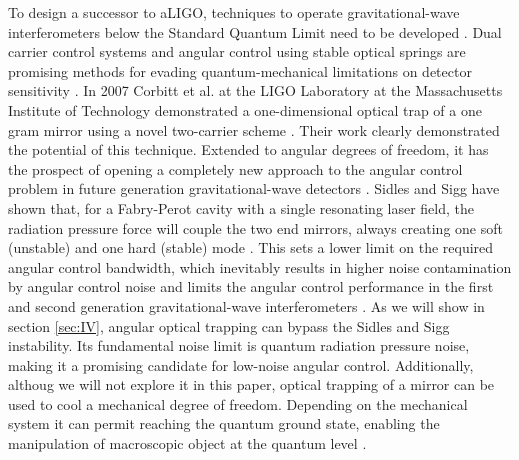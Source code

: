 \documentclass[%
 reprint,
 amsmath,amssymb,
 aps,
]{revtex4-1}
\begin{document}
To design a successor to aLIGO, techniques to operate gravitational-wave interferometers below 
the Standard Quantum Limit need to be developed \cite{Dan12, Chen13}. Dual carrier control systems and angular control 
using stable optical springs are promising methods for evading quantum-mechanical limitations on 
detector sensitivity \cite{LIGO10, Braginsky02b, Arcizet06b, Corbitt06b, Kippenberg05, Sheard04}. 
In 2007 Corbitt et al. at the LIGO Laboratory at the Massachusetts Institute of Technology 
demonstrated a one-dimensional optical trap of a one gram mirror using a novel two-carrier scheme \cite{Corbitt07}. 
Their work 
clearly demonstrated the potential of this technique. Extended to angular degrees of freedom, it has 
the prospect of opening a completely new approach to the angular control problem in future generation 
gravitational-wave detectors \cite{Punturo10}. 
Sidles and Sigg have shown that, for a Fabry-Perot cavity with a single 
resonating laser field, the radiation pressure force will couple the two end mirrors, always creating one 
soft (unstable) and one hard (stable) mode \cite{Sidles06}. This sets a lower limit on the required angular control 
bandwidth, which inevitably results in higher noise contamination by angular control noise and limits the angular control performance in the first and second generation 
gravitational-wave interferometers \cite{LIGO10, Braginsky01, Dooley13, Hirose10}. 
As we will show in section \ref{sec:IV}, angular optical trapping can bypass the Sidles and Sigg instability. Its fundamental noise limit is quantum radiation pressure noise, making it a promising candidate for low-noise angular control. Additionally, 
althoug we will not explore it in this paper, optical trapping of a mirror can be used to cool a mechanical degree of freedom. Depending on the mechanical system it can permit reaching the quantum ground state, enabling the manipulation of macroscopic object at the quantum level \cite{Teufel11, OConnell10, Chan11, TCorbitt07, Matsumoto13}. 
\end{document}
